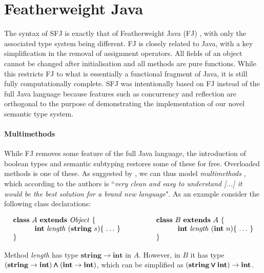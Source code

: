 \documentclass{l4proj}
\begin{document}
\section{Featherweight Java}

The syntax of SFJ is exactly that of Featherweight Java (FJ) \citep{Igarashi1999}, with only the associated type system being different.
FJ is closely related to Java, with a key simplification in the removal of assignment operators.
All fields of an object cannot be changed after initialisation and all methods are pure functions.
While this restricts FJ to what is essentially a functional fragment of Java, it is still fully computationally complete.
SFJ was intentionally based on FJ instead of the full Java language because features such as concurrency and reflection are orthogonal to the purpose of demonstrating the implementation of our novel semantic type system.

\paragraph{Multimethods}
While FJ removes some feature of the full Java language, the introduction of boolean types and semantic subtyping restores some of these for free.
Overloaded methods is one of these.
As suggested by \citet{Dardha2017}, we can thus model \emph{multimethods} \citep{BC97}, which according to the authors is ``\emph{very clean and easy to understand [...] it would be the best solution for a brand new language}".
As an example \citet{Dardha2013,Dardha2017} consider the following class declarations:

$$
    \begin{array}{ll}
        \syndecl{A}{\mathit{Object}} {
         &
            \qquad
            \syndecl{B}{A} {
                \\
                \qquad\quad \mathbf{int}\ \mathit{length}\ (\mathbf{string}\ s)\{\ \ldots\ \}\qquad
         &
                \qquad\qquad\quad \mathbf{int}\ \mathit{length}\ (\mathbf{int}\ n)\{\ \ldots\ \}
                \\
            }
         &
            \qquad }
    \end{array}
$$

Method {\it length} has type $\mathbf{string} \rightarrow \mathbf{int}$ in $A$. However, in $B$ it has type $(\mathbf{string} \rightarrow \mathbf{int}) \pmb{\wedge} (\mathbf{int} \rightarrow \mathbf{int})$,
which can be simplified as $(\mathbf{string} \pmb{\vee} \mathbf{int}) \rightarrow \mathbf{int}$.
\end{document}
